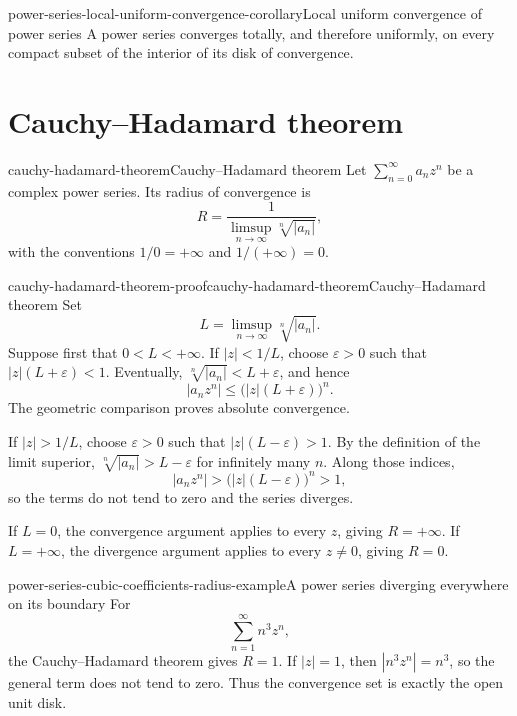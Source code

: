 \documentclass[preview]{standalone}
\begin{document}
\begin{snippetcorollary}{power-series-local-uniform-convergence-corollary}{Local uniform convergence of power series}
    A power series converges totally, and therefore uniformly, on every compact
    subset of the interior of its disk of convergence.
\end{snippetcorollary}

\section{Cauchy--Hadamard theorem}

\begin{snippettheorem}{cauchy-hadamard-theorem}{Cauchy--Hadamard theorem}
    Let \(\sum_{n=0}^{\infty}a_nz^n\) be a complex power series. Its radius
    of convergence is
    \[
        R=\frac1{\displaystyle\limsup_{n\to\infty}\sqrt[n]{|a_n|}},
    \]
    with the conventions \(1/0=+\infty\) and \(1/(+\infty)=0\).
\end{snippettheorem}

\begin{snippetproof}{cauchy-hadamard-theorem-proof}{cauchy-hadamard-theorem}{Cauchy--Hadamard theorem}
    Set
    \[
        L=\limsup_{n\to\infty}\sqrt[n]{|a_n|}.
    \]
    Suppose first that \(0<L<+\infty\). If \(|z|<1/L\), choose
    \(\varepsilon>0\) such that \(|z|(L+\varepsilon)<1\). Eventually,
    \(\sqrt[n]{|a_n|}<L+\varepsilon\), and hence
    \[
        |a_nz^n|\leq\bigl(|z|(L+\varepsilon)\bigr)^n.
    \]
    The geometric comparison proves absolute convergence.

    If \(|z|>1/L\), choose \(\varepsilon>0\) such that
    \(|z|(L-\varepsilon)>1\). By the definition of the limit superior,
    \(\sqrt[n]{|a_n|}>L-\varepsilon\) for infinitely many \(n\). Along
    those indices,
    \[
        |a_nz^n|>\bigl(|z|(L-\varepsilon)\bigr)^n>1,
    \]
    so the terms do not tend to zero and the series diverges.

    If \(L=0\), the convergence argument applies to every \(z\), giving
    \(R=+\infty\). If \(L=+\infty\), the divergence argument applies to
    every \(z\neq0\), giving \(R=0\).
\end{snippetproof}

\begin{snippetexample}{power-series-cubic-coefficients-radius-example}{A power series diverging everywhere on its boundary}
    For
    \[
        \sum_{n=1}^{\infty}n^3z^n,
    \]
    the Cauchy--Hadamard theorem gives \(R=1\). If \(|z|=1\), then
    \(|n^3z^n|=n^3\), so the general term does not tend to zero. Thus the
    convergence set is exactly the open unit disk.
\end{snippetexample}
\end{document}
